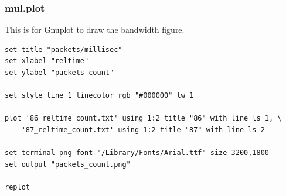 \documentclass[12pt,a4paper]{article}
\begin{document}
\subsubsection*{mul.plot}
This is for Gnuplot to draw the bandwidth figure.
\begin{lstlisting}
set title "packets/millisec"
set xlabel "reltime"
set ylabel "packets count"

set style line 1 linecolor rgb "#000000" lw 1

plot '86_reltime_count.txt' using 1:2 title "86" with line ls 1, \
	'87_reltime_count.txt' using 1:2 title "87" with line ls 2

set terminal png font "/Library/Fonts/Arial.ttf" size 3200,1800
set output "packets_count.png"

replot
\end{lstlisting}
\end{document}
